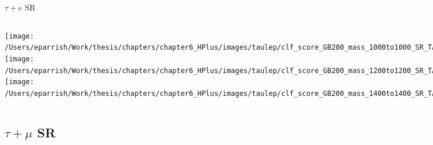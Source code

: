 \documentclass[aspectratio=169,xcolor=table]{beamer}
\begin{document}
    \begin{frame}[t]{$\tau+e$ SR}
      \begin{columns}[t]
          \texttt{[image: /Users/eparrish/Work/thesis/chapters/chapter6\_HPlus/images/taulep/clf\_score\_GB200\_mass\_1000to1000\_SR\_TAUEL.png]}
          \texttt{[image: /Users/eparrish/Work/thesis/chapters/chapter6\_HPlus/images/taulep/clf\_score\_GB200\_mass\_1200to1200\_SR\_TAUEL.png]}
          \texttt{[image: /Users/eparrish/Work/thesis/chapters/chapter6\_HPlus/images/taulep/clf\_score\_GB200\_mass\_1400to1400\_SR\_TAUEL.png]}

          \texttt{[image: /Users/eparrish/Work/thesis/chapters/chapter6\_HPlus/images/taulep/clf\_score\_GB200\_mass\_1600to1600\_SR\_TAUEL.png]}
          \texttt{[image: /Users/eparrish/Work/thesis/chapters/chapter6\_HPlus/images/taulep/clf\_score\_GB200\_mass\_1800to1800\_SR\_TAUEL.png]}
          \texttt{[image: /Users/eparrish/Work/thesis/chapters/chapter6\_HPlus/images/taulep/clf\_score\_GB200\_mass\_2000to2000\_SR\_TAUEL.png]}

          \texttt{[image: /Users/eparrish/Work/thesis/chapters/chapter6\_HPlus/images/taulep/clf\_score\_GB200\_mass\_2500to2500\_SR\_TAUEL.png]}
          \texttt{[image: /Users/eparrish/Work/thesis/chapters/chapter6\_HPlus/images/taulep/clf\_score\_GB200\_mass\_3000to3000\_SR\_TAUEL.png]}


      \end{columns}
    \end{frame}

  \subsection{$\tau+\mu$ SR}
\end{document}
